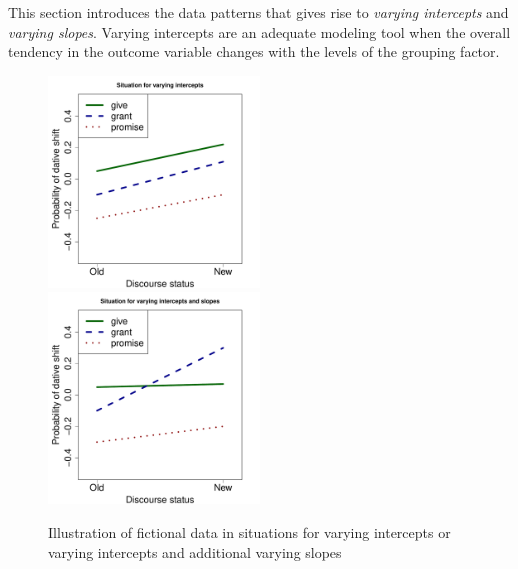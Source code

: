 \documentclass[a4paper,12pt]{article}
\begin{document}
This section introduces the data patterns that gives rise to \textit{varying intercepts} and \textit{varying slopes}. 
Varying intercepts are an adequate modeling tool when the overall tendency in the outcome variable changes with the levels of the grouping factor.

\begin{figure}[!htpb]
  \centering
  \includegraphics[width=0.5\textwidth]{graphics/var_int}~\includegraphics[width=0.5\textwidth]{graphics/var_int_slope}
  \caption{Illustration of fictional data in situations for varying intercepts or varying intercepts and additional varying slopes}
  \label{fig:varintlsope}
\end{figure}
\end{document}
